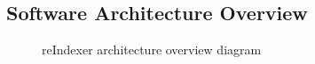 \documentclass[../main.tex]{subfiles}
\begin{document}
\subsection{Software Architecture Overview}

\begin{figure}[h!]
    \centering
    \caption{reIndexer architecture overview diagram}
    \label{fig:candidate_universe_ranking:reindexer_architecture}
\end{figure}
\end{document}
